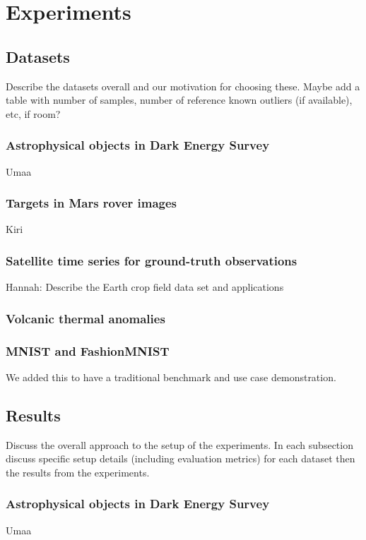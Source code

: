 \documentclass[letterpaper]{article} %
\begin{document}
\section{Experiments}

\subsection{Datasets}
Describe the datasets overall and our motivation for choosing these. Maybe add
 a table with number of samples, number of reference known outliers (if 
 available), etc, if room? 

\subsubsection{Astrophysical objects in Dark Energy Survey}
Umaa

\subsubsection{Targets in Mars rover images}
Kiri

\subsubsection{Satellite time series for ground-truth observations}
Hannah: Describe the Earth crop field data set and applications

\subsubsection{Volcanic thermal anomalies}

\subsubsection{MNIST and FashionMNIST}
We added this to have a traditional benchmark and use case demonstration. 

\subsection{Results}
Discuss the overall approach to the setup of the experiments. In each 
subsection discuss specific setup details (including evaluation metrics) for 
each dataset then the results from the experiments.

\subsubsection{Astrophysical objects in Dark Energy Survey}
Umaa
\end{document}
